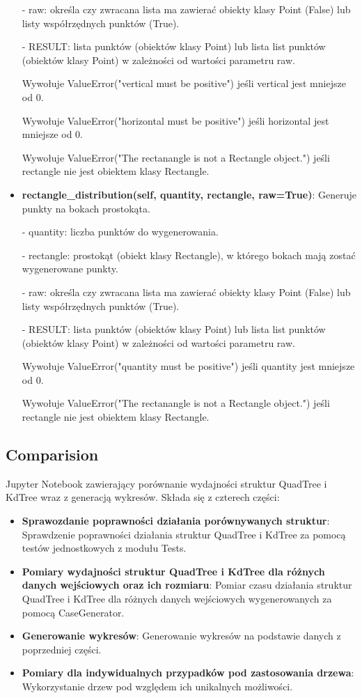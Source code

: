 \documentclass{lab}
\begin{document}
\begin{itemize}
  - raw: określa czy zwracana lista ma zawierać obiekty klasy Point (False) lub listy współrzędnych punktów (True).

  - RESULT: lista punktów (obiektów klasy Point) lub lista list punktów (obiektów klasy Point) w zależności od wartości parametru raw.

  Wywołuje ValueError("vertical must be positive") jeśli vertical jest mniejsze od 0.

  Wywołuje ValueError("horizontal must be positive") jeśli horizontal jest mniejsze od 0.

  Wywołuje ValueError("The rectanangle is not a Rectangle object.") jeśli rectangle nie jest obiektem klasy Rectangle.

  \item \textbf{rectangle\_distribution(self, quantity, rectangle, raw=True)}:
  Generuje punkty na bokach prostokąta.

  - quantity: liczba punktów do wygenerowania.

  - rectangle: prostokąt (obiekt klasy Rectangle), w którego bokach mają zostać wygenerowane punkty.

  - raw: określa czy zwracana lista ma zawierać obiekty klasy Point (False) lub listy współrzędnych punktów (True).

  - RESULT: lista punktów (obiektów klasy Point) lub lista list punktów (obiektów klasy Point) w zależności od wartości parametru raw.

  Wywołuje ValueError("quantity must be positive") jeśli quantity jest mniejsze od 0.

  Wywołuje ValueError("The rectanangle is not a Rectangle object.") jeśli rectangle nie jest obiektem klasy Rectangle.
\end{itemize}

\subsection{Comparision}
Jupyter Notebook zawierający porównanie wydajności struktur QuadTree i KdTree wraz z generacją wykresów. Składa się z czterech części:
\begin{itemize}
  \item \textbf{Sprawozdanie poprawności działania porównywanych struktur}:
  Sprawdzenie poprawności działania struktur QuadTree i KdTree za pomocą testów jednostkowych z modułu Tests.
  \item \textbf{Pomiary wydajności struktur QuadTree i KdTree dla różnych danych wejściowych oraz ich rozmiaru}:
  Pomiar czasu działania struktur QuadTree i KdTree dla różnych danych wejściowych wygenerowanych za pomocą CaseGenerator.
  \item \textbf{Generowanie wykresów}:
  Generowanie wykresów na podstawie danych z poprzedniej części.
  \item \textbf{Pomiary dla indywidualnych przypadków pod zastosowania drzewa}:
  Wykorzystanie drzew pod względem ich unikalnych możliwości.
\end{itemize}
\end{document}
